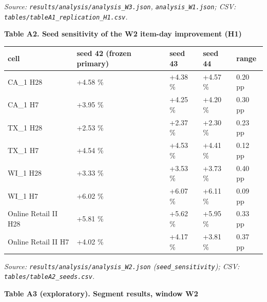 \documentclass[
]{article}
\newcounter{none} %
\begin{document}
\emph{Source: \texttt{results/analysis/analysis\_W3.json},
\texttt{analysis\_W1.json}; CSV:
\texttt{tables/tableA1\_replication\_H1.csv}.}

\textbf{Table A2. Seed sensitivity of the W2 item-day improvement (H1)}

{\def\LTcaptype{none} %
\begin{longtable}[]{@{}lllll@{}}
\toprule\noalign{}
cell & seed 42 (frozen primary) & seed 43 & seed 44 & range \\
\midrule\noalign{}
\endhead
\bottomrule\noalign{}
\endlastfoot
CA\_1 H28 & +4.58 \% & +4.38 \% & +4.57 \% & 0.20 pp \\
CA\_1 H7 & +3.95 \% & +4.25 \% & +4.20 \% & 0.30 pp \\
TX\_1 H28 & +2.53 \% & +2.37 \% & +2.30 \% & 0.23 pp \\
TX\_1 H7 & +4.54 \% & +4.53 \% & +4.41 \% & 0.12 pp \\
WI\_1 H28 & +3.33 \% & +3.53 \% & +3.73 \% & 0.40 pp \\
WI\_1 H7 & +6.02 \% & +6.07 \% & +6.11 \% & 0.09 pp \\
Online Retail II H28 & +5.81 \% & +5.62 \% & +5.95 \% & 0.33 pp \\
Online Retail II H7 & +4.02 \% & +4.17 \% & +3.81 \% & 0.37 pp \\
\end{longtable}
}

\emph{Source: \texttt{results/analysis/analysis\_W2.json}
(\texttt{seed\_sensitivity}); CSV: \texttt{tables/tableA2\_seeds.csv}.}

\textbf{Table A3 (exploratory). Segment results, window W2}
\end{document}
